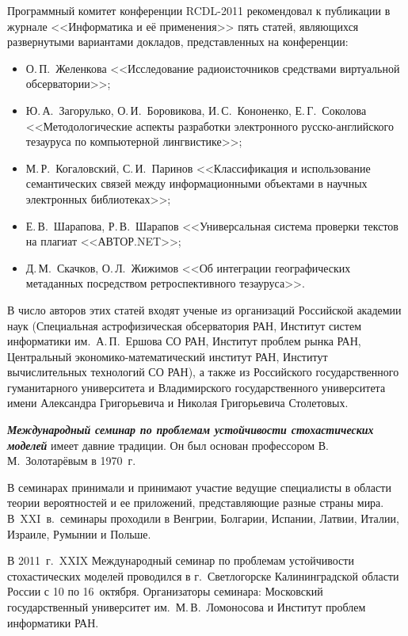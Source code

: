 {{{     Программный комитет конференции RCDL-2011 рекомендовал к публикации в 
журнале <<Информатика и её применения>> пять статей, являющихся развернутыми 
вариантами докладов, представленных на конференции:
     \begin{itemize}
\item О.\,П.~Желенкова <<Исследование радиоисточников средствами виртуальной 
обсерватории>>;
\item Ю.\,А.~Загорулько, О.\,И.~Боровикова, И.\,С.~Кононенко, Е.\,Г.~Соколова 
<<Методологические аспекты разработки электронного русско-английского 
тезауруса по компьютерной лингвистике>>;
\item М.\,Р.~Когаловский, С.\,И.~Паринов <<Классификация и использование 
семантических связей между информационными объектами в научных 
электронных библиотеках>>;
\item Е.\,В.~Шарапова, Р.\,В.~Шарапов <<Универсальная система проверки текстов 
на плагиат <<АВТОР.NET>>;
\item Д.\,М.~Скачков, О.\,Л.~Жижимов <<Об интеграции географических 
метаданных посредством ретроспективного тезауруса>>.
\end{itemize}

     В число авторов этих статей входят ученые из организаций Российской академии 
наук (Специальная астрофизическая обсерватория РАН, Институт систем информатики 
им.~А.\,П.~Ершова СО РАН, Институт проблем рынка РАН, Центральный 
     экономико-математический институт РАН, Институт вычислительных технологий 
СО РАН), а также из Российского государственного гуманитарного университета и 
Владимирского государственного университета имени Александра Григорьевича и 
Николая Григорьевича Столетовых.
     
     {\bfseries\textit{Международный семинар по проблемам устойчивости 
стохастических моделей}} имеет давние традиции. Он был основан профессором 
В.\,М.~Золотарёвым в 1970~г.
     
     В семинарах принимали и принимают участие ведущие специалисты в области 
теории вероятностей и ее приложений, представляющие разные страны мира. В~XXI~в.\ 
семинары проходили в Венгрии, Болгарии, Испании, Латвии, Италии, Израиле, Румынии 
и Польше.
     
     В 2011~г.\ XXIX Международный семинар по проблемам устойчивости 
стохастических моделей проводился в г.~Светлогорске Калининградской области России 
с 10 по 16~октября. Организаторы семинара: Московский государственный университет 
им.\ М.\,В.~Ломоносова и Институт проблем информатики РАН.
     
}}}
